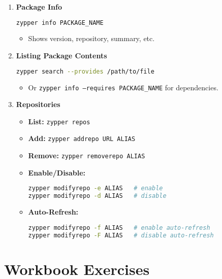 \documentclass[a4paper]{report}
\begin{document}
\begin{enumerate}
    \item \textbf{Package Info}
    \begin{lstlisting}[language=bash]
zypper info PACKAGE_NAME
    \end{lstlisting}
    \begin{itemize}
        \item Shows version, repository, summary, etc.
    \end{itemize}

    \item \textbf{Listing Package Contents}
    \begin{lstlisting}[language=bash]
zypper search --provides /path/to/file
    \end{lstlisting}
    \begin{itemize}
        \item Or \texttt{zypper info --requires PACKAGE\_NAME} for dependencies.
    \end{itemize}

    \item \textbf{Repositories}
    \begin{itemize}
        \item \textbf{List:} \texttt{zypper repos}
        \item \textbf{Add:} \texttt{zypper addrepo URL ALIAS}
        \item \textbf{Remove:} \texttt{zypper removerepo ALIAS}
        \item \textbf{Enable/Disable:}
        \begin{lstlisting}[language=bash]
zypper modifyrepo -e ALIAS   # enable
zypper modifyrepo -d ALIAS   # disable
        \end{lstlisting}
        \item \textbf{Auto-Refresh:}
        \begin{lstlisting}[language=bash]
zypper modifyrepo -f ALIAS   # enable auto-refresh
zypper modifyrepo -F ALIAS   # disable auto-refresh
        \end{lstlisting}
    \end{itemize}
\end{enumerate}

\section*{Workbook Exercises}
\end{document}
